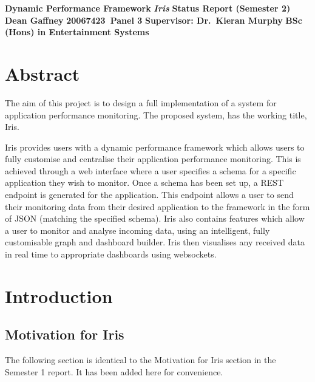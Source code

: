 \documentclass[12pt,a4paper,titlepage]{report}
\newcommand\AcademicTitle{Dynamic Performance Framework}
\newcommand\CommericalTitle{Iris}
\newcommand\Author{Dean Gaffney}
\newcommand\StudentID{20067423}
\newcommand\Report{Status Report (Semester 2)}
\newcommand\Reader{Supervisor: Dr.~Kieran Murphy}
\newcommand\SecondReader{Second Reader: David Drohan}
\begin{document}

\thispagestyle{empty}
\begin{center}
\mbox{}\vfill
{\fontsize{18pt}{20pt}\selectfont \bfseries \AcademicTitle}
\vfill
{\fontsize{14pt}{20pt}\selectfont \bfseries\itshape \CommericalTitle}
\vfill
{\fontsize{12pt}{20pt}\selectfont \bfseries \Report}
\vfill
{\fontsize{14pt}{20pt}\selectfont \bfseries \Author}
\vfill
{\fontsize{14pt}{20pt}\selectfont \bfseries \StudentID\ Panel 3}
\vfill
{\fontsize{14pt}{20pt}\selectfont \bfseries \Reader}
\vfill
\vfill
{\fontsize{14pt}{20pt}\selectfont \bfseries BSc (Hons) in Entertainment Systems}
\vfill
\end{center}
\clearpage

\tableofcontents
\listoftables
\listoffigures

\clearpage
{}
\setcounter{page}{1}

\chapter{Abstract}

The aim of this project is to design a full implementation of a system for application performance monitoring. The proposed system, has the working title,  Iris.

Iris provides users with a dynamic performance framework which allows users to fully customise and centralise their application performance monitoring. This is achieved through a web interface where a user specifies a schema for a specific application they wish to monitor. Once a schema has been set up, a REST endpoint is generated for the application. This endpoint allows a user to send their monitoring data from their desired application to the framework in the form of JSON (matching the specified schema). Iris also contains features which allow a user to monitor and analyse incoming data, using an intelligent, fully customisable graph and dashboard builder. Iris then visualises any received data in real time to appropriate dashboards using websockets.

\chapter{Introduction}

\section{Motivation for Iris}
The following section is identical to the Motivation for Iris section in the Semester 1 report. It has been added here for convenience.
\end{document}

